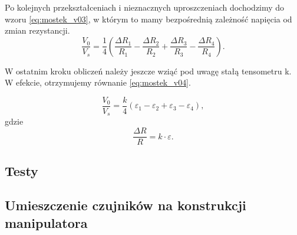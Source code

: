 \documentclass[printmode]{mgr}
\begin{document}
Po kolejnych przekształceniach i nieznacznych uproszczeniach dochodzimy do wzoru \ref{eq:mostek_v03}, w którym to
mamy bezpośrednią zależność napięcia od zmian rezystancji.
\begin{equation}
\frac{V_0}{V_s} = \frac{1}{4}(\frac{\Delta R_1}{R_1} - \frac{\Delta R_2}{R_2} + \frac{\Delta R_3}{R_3} - \frac{\Delta R_4}{R_4}).
\label{eq:mostek_v03}
\end{equation}

W ostatnim kroku obliczeń należy jeszcze wziąć pod uwagę stałą tensometru k. W efekcie, otrzymujemy równanie \ref{eq:mostek_v04}.

\begin{equation}
\frac{V_0}{V_s} = \frac{k}{4}(\varepsilon_1 - \varepsilon_2 + \varepsilon_3 - \varepsilon_4),
\label{eq:mostek_v04}
\end{equation}
gdzie
\begin{equation}
\frac{\Delta R}{R} = k \cdot \varepsilon.
\label{eq:mostek_v05}
\end{equation}


\subsection{Testy}

\subsection{Umieszczenie czujników na konstrukcji manipulatora}











\end{document}

